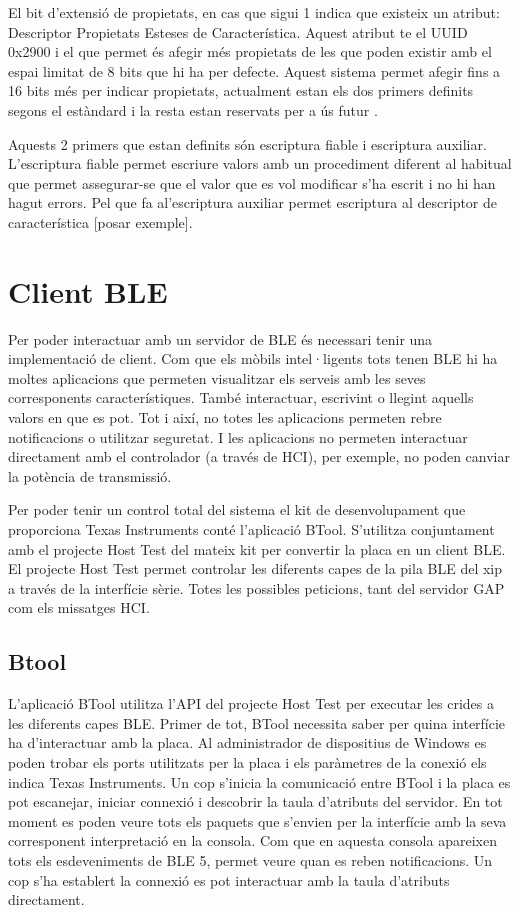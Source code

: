 El bit d'extensió de propietats, en cas que sigui 1 indica que existeix un atribut: Descriptor Propietats Esteses de Característica.
Aquest atribut te el UUID 0x2900 i el que permet és afegir més propietats de les que poden existir amb el espai limitat de 8 bits que hi ha per defecte.
Aquest sistema permet afegir fins a 16 bits més per indicar propietats, actualment estan els dos primers definits segons el estàndard i la resta estan reservats per a ús futur \cite{extended properties}.

Aquests 2 primers que estan definits són escriptura fiable i escriptura auxiliar.
L'escriptura fiable permet escriure valors amb un procediment diferent al habitual que permet assegurar-se que el valor que es vol modificar s'ha escrit i no hi han hagut errors.
Pel que fa  al'escriptura auxiliar permet escriptura al descriptor de característica [posar exemple].



\section{Client BLE}
Per poder interactuar amb un servidor de BLE és necessari tenir una implementació de client.
Com que els mòbils intel·ligents tots tenen BLE hi ha moltes aplicacions que permeten visualitzar els serveis amb les seves corresponents característiques.
També interactuar, escrivint o llegint aquells valors en que es pot.
Tot i així, no totes les aplicacions permeten rebre notificacions o utilitzar seguretat.
I les aplicacions no permeten interactuar directament amb el controlador (a través de HCI), per exemple, no poden canviar la potència de transmissió. 

Per poder tenir un control total del sistema el kit de desenvolupament que proporciona Texas Instruments conté l'aplicació BTool.
S'utilitza conjuntament amb el projecte Host Test del mateix kit per convertir la placa en un client BLE.
El projecte Host Test permet controlar les diferents capes de la pila BLE del xip a través de la interfície sèrie.
Totes les possibles peticions, tant del servidor GAP com els missatges HCI.

\subsection{Btool}
L'aplicació BTool utilitza l'API del projecte Host Test per executar les crides a les diferents capes BLE.
Primer de tot, BTool necessita saber per quina interfície ha d'interactuar amb la placa.
Al administrador de dispositius de Windows es poden trobar els ports utilitzats per la placa i els paràmetres de la conexió els indica Texas Instruments\cite{serial_params}.
Un cop s'inicia la comunicació entre BTool i la placa es pot escanejar, iniciar connexió i descobrir la taula d'atributs del servidor.
En tot moment es poden veure tots els paquets que s'envien per la interfície amb la seva corresponent interpretació en la consola.
Com que en aquesta consola apareixen tots els esdeveniments de BLE 5, permet veure quan es reben notificacions.
Un cop s'ha establert la connexió es pot interactuar amb la taula d'atributs directament.


